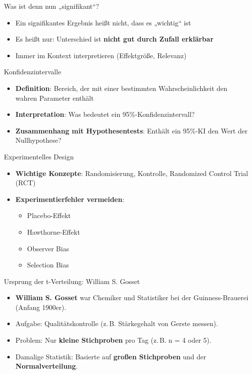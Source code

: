 \documentclass[
  ignorenonframetext,
]{beamer}
\providecommand{\tightlist}{%
  \setlength{\itemsep}{0pt}\setlength{\parskip}{0pt}}
\begin{document}
\begin{frame}{Was ist denn nun „signifikant``?}
\protect{}\label{was-ist-denn-nun-signifikant}
\begin{itemize}
\tightlist
\item
  Ein signifikantes Ergebnis heißt nicht, dass es „wichtig`` ist
\item
  Es heißt nur: Unterschied ist \textbf{nicht gut durch Zufall
  erklärbar}
\item
  Immer im Kontext interpretieren (Effektgröße, Relevanz)
\end{itemize}
\end{frame}

\begin{frame}{Konfidenzintervalle}
\protect{}\label{konfidenzintervalle}
\begin{itemize}
\item
  \textbf{Definition}: Bereich, der mit einer bestimmten
  Wahrscheinlichkeit den wahren Parameter enthält
\item
  \textbf{Interpretation}: Was bedeutet ein 95\%-Konfidenzintervall?
\item
  \textbf{Zusammenhang mit Hypothesentests}: Enthält ein 95\%-KI den
  Wert der Nullhypothese?
\end{itemize}
\end{frame}

\begin{frame}{Experimentelles Design}
\protect{}\label{experimentelles-design}
\begin{itemize}
\tightlist
\item
  \textbf{Wichtige Konzepte}: Randomisierung, Kontrolle, Randomized
  Control Trial (RCT)
\item
  \textbf{Experimentierfehler vermeiden}:

  \begin{itemize}
  \tightlist
  \item
    Placebo-Effekt
  \item
    Hawthorne-Effekt
  \item
    Observer Bias
  \item
    Selection Bias
  \end{itemize}
\end{itemize}
\end{frame}

\begin{frame}{Ursprung der t-Verteilung: William S. Gosset}
\protect{}\label{ursprung-der-t-verteilung-william-s.-gosset}
\begin{itemize}
\tightlist
\item
  \textbf{William S. Gosset} war Chemiker und Statistiker bei der
  Guinness-Brauerei (Anfang 1900er).
\item
  Aufgabe: Qualitätskontrolle (z.\,B. Stärkegehalt von Gerste messen).
\item
  Problem: Nur \textbf{kleine Stichproben} pro Tag (z.\,B. n = 4 oder
  5).
\item
  Damalige Statistik: Basierte auf \textbf{großen Stichproben} und der
  \textbf{Normalverteilung}.
\end{itemize}
\end{frame}
\end{document}
